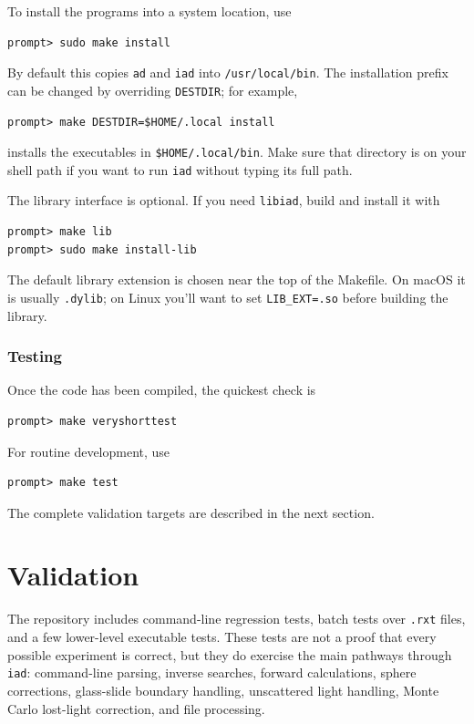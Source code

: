 \documentclass{article}
\newcommand\iadprog{\texttt{iad}}
\begin{document}
To install the programs into a system location, use
\begin{verbatim}
prompt> sudo make install
\end{verbatim}
By default this copies \texttt{ad} and \iadprog{} into \texttt{/usr/local/bin}.
The installation prefix can be changed by overriding \texttt{DESTDIR}; for
example,
\begin{verbatim}
prompt> make DESTDIR=$HOME/.local install
\end{verbatim}
installs the executables in \texttt{\$HOME/.local/bin}.  Make sure that
directory is on your shell path if you want to run \iadprog{} without typing
its full path.

The library interface is optional.  If you need \texttt{libiad}, build and
install it with
\begin{verbatim}
prompt> make lib
prompt> sudo make install-lib
\end{verbatim}
The default library extension is chosen near the top of the Makefile.  On
macOS it is usually \texttt{.dylib}; on Linux you'll want to set
\texttt{LIB\_EXT=.so} before building the library.

\subsubsection{Testing}

Once the code has been compiled, the quickest check is
\begin{verbatim}
prompt> make veryshorttest
\end{verbatim}
For routine development, use
\begin{verbatim}
prompt> make test
\end{verbatim}
The complete validation targets are described in the next section.

\clearpage

\section{Validation}

The repository includes command-line regression tests, batch tests over
\texttt{.rxt} files, and a few lower-level executable tests.  These tests are
not a proof that every possible experiment is correct, but they do exercise the
main pathways through \iadprog{}: command-line parsing, inverse searches,
forward calculations, sphere corrections, glass-slide boundary handling,
unscattered light handling, Monte Carlo lost-light correction, and file
processing.
\end{document}
